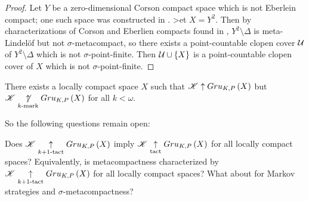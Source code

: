 \begin{proof}
  Let $Y$ be a zero-dimensional Corson compact space which is not Eberlein
  compact; one such space was constructed in \cite{Marciszewski1991291}.
  >et $X=Y^2$.
  Then by characterizations of Corson and Eberlien compacts found in
  \cite{MR752278},
  $Y^2\setminus\Delta$ is meta-Lindel\"of but not $\sigma$-metacompact, so
  there exists a point-countable clopen cover $\mathcal{U}$ of $Y^2\setminus\Delta$
  which is not $\sigma$-point-finite. Then $\mathcal{U}\cup\{X\}$ is a point-countable
  clopen cover of $X$ which is not $\sigma$-point-finite.
\end{proof}

\begin{cor}
  There exists a locally compact space $X$ such that $\mathscr{K}\uparrow Gru_{K,P}\left({X}\right)$
  but $\mathscr{K}\underset{k\text{-mark}}{\not\uparrow} Gru_{K,P}\left({X}\right)$ for all $k<\omega$.
\end{cor}

So the following questions remain open:

\begin{ques}
  Does $\mathscr{K}\underset{k+1\text{-tact}}{\uparrow}Gru_{K,P}\left({X}\right)$ imply
  $\mathscr{K}\underset{\text{tact}}{\uparrow}Gru_{K,P}\left({X}\right)$ for all locally compact spaces?
  Equivalently, is metacompactness characterized by
  $\mathscr{K}\underset{k+1\text{-tact}}{\uparrow}Gru_{K,P}\left({X}\right)$ for all locally compact spaces?
  What about for Markov strategies and $\sigma$-metacompactness?
\end{ques}
